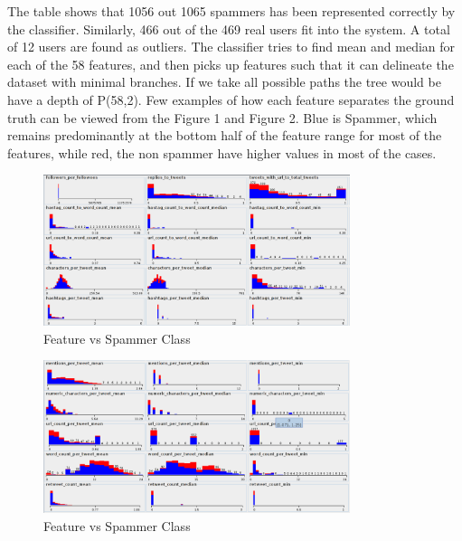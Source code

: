 \documentclass[11pt]{article}
\begin{document}
The table shows that 1056 out 1065 spammers has been represented correctly by the classifier. Similarly, 466 out of the 469 real users fit into the system. A total of 12 users are found as outliers. The classifier tries to find mean and median for each of the 58 features, and then picks up features such that it can delineate the dataset with minimal branches. If we take all possible paths the tree would be have a depth of P(58,2). Few examples of how each feature separates the ground truth can be viewed from the Figure 1 and Figure 2. Blue is Spammer, which remains predominantly at the bottom half of the feature range for most of the features, while red, the non spammer have higher values in most of the cases.

\begin{figure}
\centering
\includegraphics[width=0.80\textwidth,natwidth=610,natheight=642]{feature_vs_spammer_class_1.pdf}
\caption{Feature vs Spammer Class}
\end{figure}

\begin{figure}
\centering
\includegraphics[width=0.80\textwidth,natwidth=610,natheight=642]{feature_vs_spammer_class_2.pdf}
\caption{Feature vs Spammer Class}
\end{figure}
\end{document}

